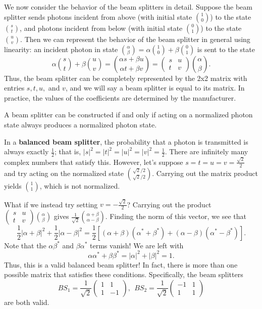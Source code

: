     We now consider the behavior of the beam splitters in detail. Suppose the beam splitter sends photons incident from above (with initial state $1\choose0$) to the state $s\choose t$, and photons incident from below (with initial state $0\choose1$) to the state $u\choose v$. Then we can represent the behavior of the beam splitter in general using linearity: an incident photon in state ${\alpha\choose\beta} =\alpha {1\choose0}+ \beta {0\choose1}$ is sent to the state $$\alpha{s\choose t}+\beta{u\choose v}={\alpha s+\beta u\choose \alpha t+\beta v}=\begin{pmatrix}
      s & u\\ 
      t & v
    \end{pmatrix}{\alpha\choose\beta}.$$Thus, the beam splitter can be completely represented by the 2x2 matrix with entries $s,t,u,$ and $v$, and we will say a beam splitter is equal to its matrix. In practice, the values of the coefficients are determined by the manufacturer. 
    
    \begin{framedrmk*}
        A beam splitter can be constructed if and only if acting on a normalized photon state always produces a normalized photon state. 
    \end{framedrmk*}
    
    In a \textbf{balanced beam splitter}, the probability that a photon is transmitted is always exactly $\frac{1}{2}$; that is, $|s|^2=|t|^2=|u|^2=|v|^2=\frac{1}{2}$. There are infinitely many complex numbers that satisfy this. However, let's suppose $s=t=u=v=\frac{\sqrt{2}}{2}$ and try acting on the normalized state $\sqrt{2}/{2}\choose \sqrt{2}/{2}$. Carrying out the matrix product yields $1\choose1$, which is not normalized.
    
    What if we instead try setting $v=-\frac{\sqrt{2}}{2}$? Carrying out the product $(\begin{smallmatrix}  s & u\\   t & v\end{smallmatrix}){\alpha\choose\beta}$ gives $\frac{1}{\sqrt{2}}{\alpha+\beta\choose \alpha-\beta}$. Finding the norm of this vector, we see that $$\frac{1}{2}|\alpha+\beta|^2+\frac{1}{2}|\alpha-\beta|^2=\frac{1}{2}[(\alpha+\beta)(\alpha^*+\beta^*)+(\alpha-\beta)(\alpha^*-\beta^*)].$$Note that the $\alpha\beta^*$ and $\beta\alpha^*$ terms vanish! We are left with $$\alpha\alpha^*+\beta\beta^*=|\alpha|^2+|\beta|^2=1.$$Thus, this is a valid balanced beam splitter! In fact, there is more than one possible matrix that satisfies these conditions. Specifically, the beam splitters $$BS_1=\frac{1}{\sqrt{2}}\begin{pmatrix}
      1 & 1\\ 
      1 & -1
    \end{pmatrix},\:\: BS_2=\frac{1}{\sqrt{2}}\begin{pmatrix}
      -1 & 1\\ 
      1 & 1
    \end{pmatrix}$$are both valid.

